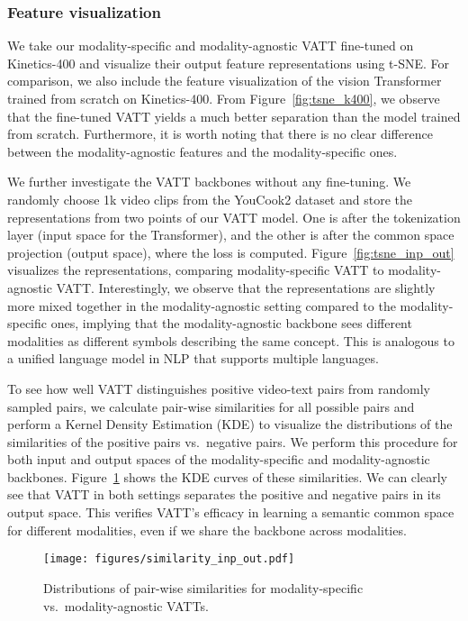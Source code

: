 \documentclass[10pt,twocolumn,letterpaper]{article}
\newcommand{\ours}{VATT\xspace}
\begin{document}
\subsubsection{Feature visualization}
We take our modality-specific and modality-agnostic \ours fine-tuned on Kinetics-400 and visualize their output feature representations using t-SNE. For comparison, we also include the feature visualization of the vision Transformer trained from scratch on Kinetics-400. From Figure~\ref{fig:tsne_k400}, we observe that the fine-tuned \ours yields a much better separation than the model trained from scratch. Furthermore, it is worth noting that there is no clear difference between the modality-agnostic features and the modality-specific ones.


We further investigate the \ours backbones without any fine-tuning. We randomly choose 1k video clips from the YouCook2 dataset and store the representations from two points of our \ours model. One is after the tokenization layer (input space for the Transformer), and the other is after the common space projection (output space), where the loss is computed. Figure~\ref{fig:tsne_inp_out} visualizes the representations, comparing modality-specific \ours to modality-agnostic \ours. Interestingly, we observe that the representations are slightly more mixed together in the modality-agnostic setting compared to the modality-specific ones, implying that the modality-agnostic backbone sees different modalities as different symbols describing the same concept. This is analogous to a unified language model in NLP that supports multiple languages.

To see how well \ours distinguishes positive video-text pairs from randomly sampled pairs, we calculate pair-wise similarities for all possible pairs and perform a Kernel Density Estimation (KDE) to visualize the distributions of the similarities of the positive pairs vs.\ negative pairs. We perform this procedure for both input and output spaces of the modality-specific and modality-agnostic backbones. Figure~\ref{fig:sim_inp_out} shows the KDE curves of these similarities. We can clearly see that \ours in both settings separates the positive and negative pairs in its output space. This verifies \ours's efficacy in learning a semantic common space for different modalities, even if we share the backbone across modalities.

\begin{figure}[t]
\centering
   \texttt{[image: figures/similarity\_inp\_out.pdf]}
   \caption{Distributions of pair-wise similarities for modality-specific vs.\ modality-agnostic {\ours}s.}
\label{fig:sim_inp_out}
\vspace{-2mm}
\end{figure}
\end{document}
